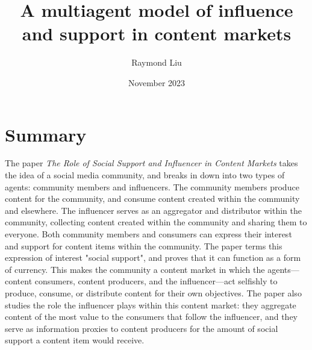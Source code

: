 \documentclass[11pt, letterpaper]{article}
\title{A multiagent model of influence and support in content markets}
\author{Raymond Liu}
\date{November 2023}
\begin{document}
\maketitle

\tableofcontents

\pagebreak

\section{Summary}

The paper \textit{The Role of Social Support and Influencer in Content Markets} takes the idea of a social media community, and breaks in down into two types of agents: community members and influencers. The community members produce content for the community, and consume content created within the community and elsewhere. The influencer serves as an aggregator and distributor within the community, collecting content created within the community and sharing them to everyone. Both community members and consumers can express their interest and support for content items within the community. The paper terms this expression of interest "social support", and proves that it can function as a form of currency. This makes the community a content market in which the agents---content consumers, content producers, and the influencer---act selfishly to produce, consume, or distribute content for their own objectives. The paper also studies the role the influencer plays within this content market: they aggregate content of the most value to the consumers that follow the influencer, and they serve as information proxies to content producers for the amount of social support a content item would receive.
\end{document}
